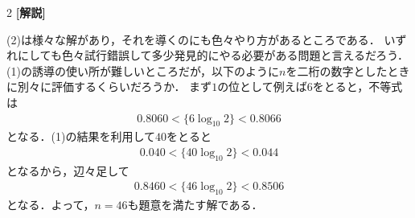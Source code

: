 \documentclass[../../main.tex]{subfiles}
\begin{document}
\begin{multicols}{2}
  {\bf [解説]}

  (2)は様々な解があり，それを導くのにも色々やり方があるところである．
  いずれにしても色々試行錯誤して多少発見的にやる必要がある問題と言えるだろう．
  (1)の誘導の使い所が難しいところだが，以下のように$n$を二桁の数字としたときに別々に評価するくらいだろうか．
  まず$1$の位として例えば$6$をとると，不等式は
  \begin{align}
    0.8060 < \{6\log_{10} 2\} < 0.8066
  \end{align}
  となる．(1)の結果を利用して$40$をとると
  \begin{align}
    0.040 < \{40\log_{10} 2\} < 0.044
  \end{align}
  となるから，辺々足して
  \begin{align}
    0.8460 < \{46\log_{10} 2\} < 0.8506
  \end{align}
  となる．よって，$n=46$も題意を満たす解である．

  \newpage
\end{multicols}
\end{document}
